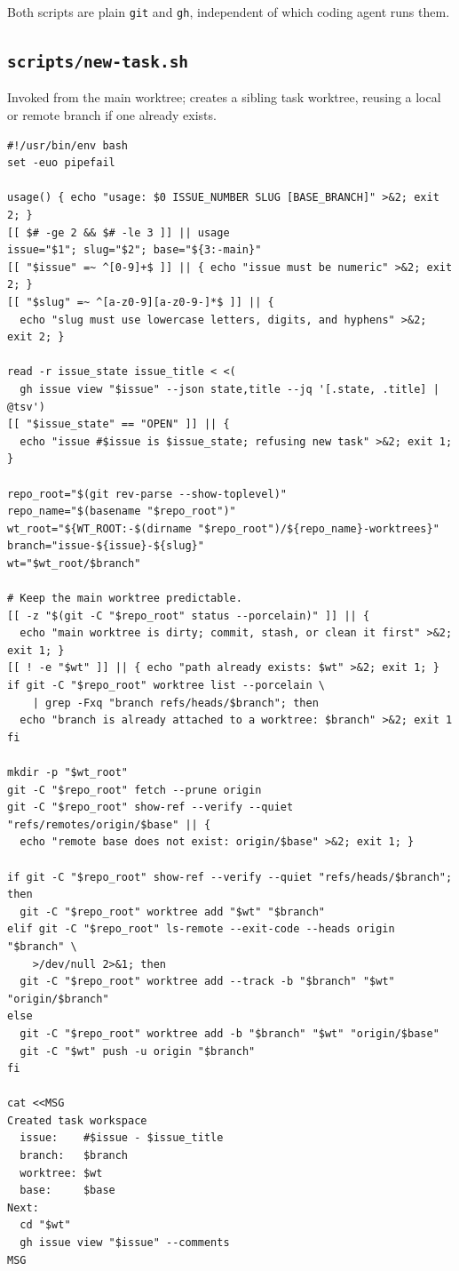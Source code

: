 \documentclass[11pt]{article}
\newcommand{\co}[1]{\lstinline[basicstyle=\ttfamily\color{gwInk}]{#1}}
\begin{document}
Both scripts are plain \co{git} and \co{gh}, independent of which coding agent runs them.

\subsection{\texttt{scripts/new-task.sh}}

Invoked from the main worktree; creates a sibling task worktree, reusing a local or remote branch
if one already exists.

\begin{lstlisting}[style=gw]
#!/usr/bin/env bash
set -euo pipefail

usage() { echo "usage: $0 ISSUE_NUMBER SLUG [BASE_BRANCH]" >&2; exit 2; }
[[ $# -ge 2 && $# -le 3 ]] || usage
issue="$1"; slug="$2"; base="${3:-main}"
[[ "$issue" =~ ^[0-9]+$ ]] || { echo "issue must be numeric" >&2; exit 2; }
[[ "$slug" =~ ^[a-z0-9][a-z0-9-]*$ ]] || {
  echo "slug must use lowercase letters, digits, and hyphens" >&2; exit 2; }

read -r issue_state issue_title < <(
  gh issue view "$issue" --json state,title --jq '[.state, .title] | @tsv')
[[ "$issue_state" == "OPEN" ]] || {
  echo "issue #$issue is $issue_state; refusing new task" >&2; exit 1; }

repo_root="$(git rev-parse --show-toplevel)"
repo_name="$(basename "$repo_root")"
wt_root="${WT_ROOT:-$(dirname "$repo_root")/${repo_name}-worktrees}"
branch="issue-${issue}-${slug}"
wt="$wt_root/$branch"

# Keep the main worktree predictable.
[[ -z "$(git -C "$repo_root" status --porcelain)" ]] || {
  echo "main worktree is dirty; commit, stash, or clean it first" >&2; exit 1; }
[[ ! -e "$wt" ]] || { echo "path already exists: $wt" >&2; exit 1; }
if git -C "$repo_root" worktree list --porcelain \
    | grep -Fxq "branch refs/heads/$branch"; then
  echo "branch is already attached to a worktree: $branch" >&2; exit 1
fi

mkdir -p "$wt_root"
git -C "$repo_root" fetch --prune origin
git -C "$repo_root" show-ref --verify --quiet "refs/remotes/origin/$base" || {
  echo "remote base does not exist: origin/$base" >&2; exit 1; }

if git -C "$repo_root" show-ref --verify --quiet "refs/heads/$branch"; then
  git -C "$repo_root" worktree add "$wt" "$branch"
elif git -C "$repo_root" ls-remote --exit-code --heads origin "$branch" \
    >/dev/null 2>&1; then
  git -C "$repo_root" worktree add --track -b "$branch" "$wt" "origin/$branch"
else
  git -C "$repo_root" worktree add -b "$branch" "$wt" "origin/$base"
  git -C "$wt" push -u origin "$branch"
fi

cat <<MSG
Created task workspace
  issue:    #$issue - $issue_title
  branch:   $branch
  worktree: $wt
  base:     $base
Next:
  cd "$wt"
  gh issue view "$issue" --comments
MSG
\end{lstlisting}
\end{document}
